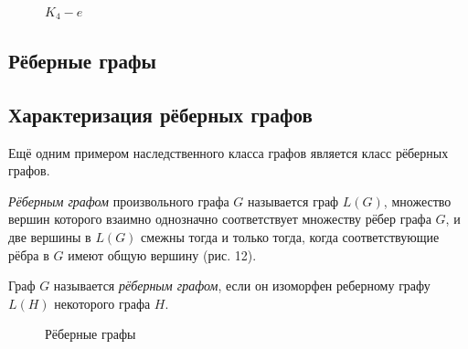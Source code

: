 \documentclass[12pt]{article}
\begin{document}
\begin{figure}
	\label{pic10}
	\caption{$K_4 - e$}
\end{figure}


\newpage

\begin{center}
	\section{Рёберные графы}
	\subsection{Характеризация рёберных графов}
\end{center}

Ещё одним примером наследственного класса графов является класс рёберных графов.%

{\it Рёберным графом} 
произвольного графа $G$ называется граф $L(G)$, множество вершин которого взаимно однозначно соответствует множеству рёбер графа $G$, и две вершины в $L(G)$ смежны тогда и только тогда, когда соответствующие рёбра в $G$ имеют общую вершину (рис. 12).

Граф $G$ называется {\it рёберным графом}, если он изоморфен реберному графу $L(H)$ некоторого графа $H$.

\begin{figure}
	\label{pic11}
	\caption{Рёберные графы}

\end{figure}
\end{document}
